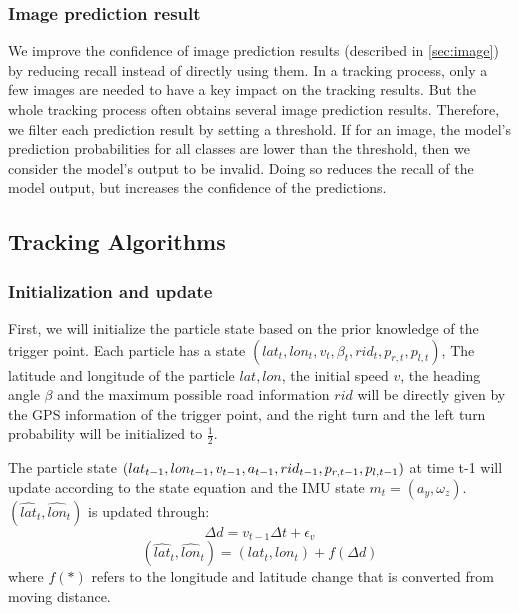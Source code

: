 \documentclass[journal]{IEEEtran}
\begin{document}
\subsubsection{Image prediction result}
We improve the confidence of image prediction results (described in \ref{sec:image}) by reducing recall instead of directly using them. 
In a tracking process, only a few images are needed to have a key impact on the tracking results. But the whole tracking process often obtains several image prediction results. Therefore, we filter each prediction result by setting a threshold. If for an image, the model's prediction probabilities for all classes are lower than the threshold, then we consider the model's output to be invalid. Doing so reduces the recall of the model output, but increases the confidence of the predictions.


\subsection{Tracking Algorithms}

\subsubsection{Initialization and update}


First, we will initialize the particle state based on the prior knowledge of the trigger point. Each particle has a state $(lat_{t},lon_{t},v_{t},\beta_{t},rid_{t},p_{r,t},p_{l,t})$, The latitude and longitude of the particle $lat, lon$, the initial speed $v$, the heading angle $\beta$ and the maximum possible road information $rid$ will be directly given by the GPS information of the trigger point, and the right turn and the left turn probability will be initialized to $\frac{1}{2}$.


The particle state $(lat_{t-1},lon_{t-1},v_{t-1},a_{t-1},rid_{t-1},p_{r,t-1},\\
p_{l,t-1})$ at time t-1 will update according to the state equation and the IMU state $m_t=(a_y,\omega_z)$. $(\hat{lat}_t,\hat{lon}_t)$ is updated through:
\begin{equation}
\Delta{d} = v_{t-1}\Delta{t}+\epsilon_v
\end{equation}
\begin{equation}
(\hat{lat}_t, \hat{lon}_t) =(lat_{t},lon_{t})+f(\Delta d)
\end{equation}
where $f(*)$ refers to the longitude and latitude change that is converted from moving distance.
\end{document}
